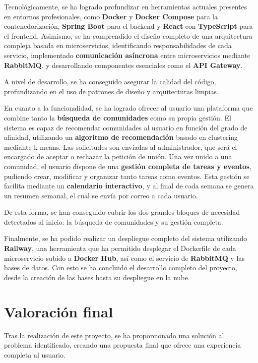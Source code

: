 Tecnológicamente, se ha logrado profundizar en herramientas actuales presentes en entornos profesionales, como \textbf{Docker} y \textbf{Docker Compose} para la contenedorización, \textbf{Spring Boot} para el backend y \textbf{React} con \textbf{TypeScript} para el frontend. Asimismo, se ha comprendido el diseño completo de una arquitectura compleja basada en microservicios, identificando responsabilidades de cada servicio, implementado \textbf{comunicación asíncrona} entre microservicios mediante \textbf{RabbitMQ}, y desarrollando componentes esenciales como el \textbf{API Gateway}.

A nivel de desarrollo, se ha conseguido asegurar la calidad del código, profundizando en el uso de patrones de diseño y arquitecturas limpias.

En cuanto a la funcionalidad, se ha logrado ofrecer al usuario una plataforma que combine tanto la \textbf{búsqueda de comunidades} como su propia gestión.  
El sistema es capaz de recomendar comunidades al usuario en función del grado de afinidad, utilizando un \textbf{algoritmo de recomendación} basado en clustering mediante k-means.  Las solicitudes son enviadas al administrador, que será el encargado de aceptar o rechazar la petición de unión.  Una vez unido a una comunidad, el usuario dispone de una \textbf{gestión completa de tareas y eventos}, pudiendo crear, modificar y organizar tanto tareas como eventos. Esta gestión se facilita mediante un \textbf{calendario interactivo}, y al final de cada semana se genera un resumen semanal, el cual se envía por correo a cada usuario.  

De esta forma, se han conseguido cubrir los dos grandes bloques de necesidad detectados al inicio: la búsqueda de comunidades y su gestión completa.


Finalmente, se ha podido realizar un despliegue completo del sistema utilizando \textbf{Railway}, una herramienta que ha permitido desplegar el Dockerfile de cada microservicio subido a \textbf{Docker Hub}, así como el servicio de \textbf{RabbitMQ} y las bases de datos. Con esto se ha concluido el desarrollo completo del proyecto, desde la creación de las bases hasta su despliegue en la nube.
\section{Valoración final}

Tras la realización de este proyecto, se ha proporcionado una solución al problema identificado, creando una propuesta final que ofrece una experiencia completa al usuario.

